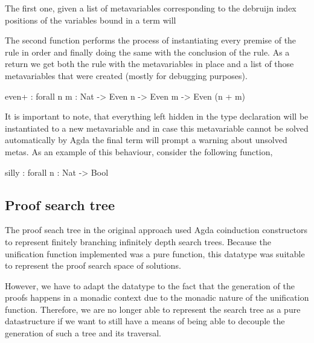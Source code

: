 \documentclass[12pt]{article}
\begin{document}
The first one, given a list of metavariables corresponding to the debruijn index
positions of the variables bound in a term will

The second function performs the process of instantiating every premise of the
rule in order and finally doing the same with the conclusion of the rule. As a
return we get both the rule with the metavariables in place and a list of those
metavariables that were created (mostly for debugging purposes).


\begin{code}
even+ : forall {n m : Nat} -> Even n -> Even m -> Even (n + m)
\end{code}

It is important to note, that everything left hidden in the type declaration
will be instantiated to a new metavariable and in case this metavariable cannot
be solved automatically by Agda the final term will prompt a warning about
unsolved metas. As an example of this behaviour, consider the following
function,

\begin{code}
silly : forall {n : Nat} -> Bool
\end{code}




































\subsection{Proof search tree}

The proof seach tree in the original approach used Agda coinduction constructors
to represent finitely branching infinitely depth search trees. Because the
unification function implemented was a pure function, this datatype was suitable
to represent the proof search space of solutions.

However, we have to adapt the datatype to the fact that the generation of the
proofs happens in a monadic context due to the monadic nature of the unification
function. Therefore, we are no longer able to represent the search tree as a
pure datastructure if we want to still have a means of being able to decouple
the generation of such a tree and its traversal.
\end{document}
